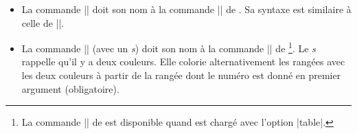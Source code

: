 \documentclass[dvipsnames]{article}%
\begin{document}
\begin{itemize}
\begin{scope}
\hfuzz=10cm
\begin{BVerbatim}[boxwidth=9cm,baseline=c]
$\begin{NiceArray}{lll}[hvlines, ~emphase#code-before = \rowcolor{red!15}{1,3-5,8-}@]
a_1 & b_1 & c_1 \\
a_2 & b_2 & c_2 \\
a_3 & b_3 & c_3 \\
a_4 & b_4 & c_4 \\
a_5 & b_5 & c_5 \\
a_6 & b_6 & c_6 \\
a_7 & b_7 & c_7 \\
a_8 & b_8 & c_8 \\
a_9 & b_9 & c_9 \\
a_{10} & b_{10} & c_{10} \\
\end{NiceArray}$
\end{BVerbatim}
%
$\begin{NiceArray}{lll}%
[baseline=4,hvlines, code-before = \rowcolor{red!15}{1,3-5,8-}]
a_1 & b_1 & c_1 \\
a_2 & b_2 & c_2 \\
a_3 & b_3 & c_3 \\
a_4 & b_4 & c_4 \\
a_5 & b_5 & c_5 \\
a_6 & b_6 & c_6 \\
a_7 & b_7 & c_7 \\
a_8 & b_8 & c_8 \\
a_9 & b_9 & c_9 \\
a_{10} & b_{10} & c_{10} \\
\end{NiceArray}$
\end{scope}


\bigskip
\item La commande |\columncolor| doit son nom à la commande |\columncolor| de
. Sa syntaxe est similaire à celle de |\rowcolor|.

\bigskip
\item La commande |\rowcolors| (avec un \emph{s}) doit son nom à la commande
|\rowcolors| de \footnote{La commande |\rowcolors| de 
  est disponible quand  est chargé avec l'option |table|.}. Le
\emph{s} rappelle qu'il y a deux couleurs. Elle colorie alternativement les
rangées avec les deux couleurs à partir de la rangée dont le numéro est donné en
premier argument (obligatoire).


\end{itemize}
\end{document}
